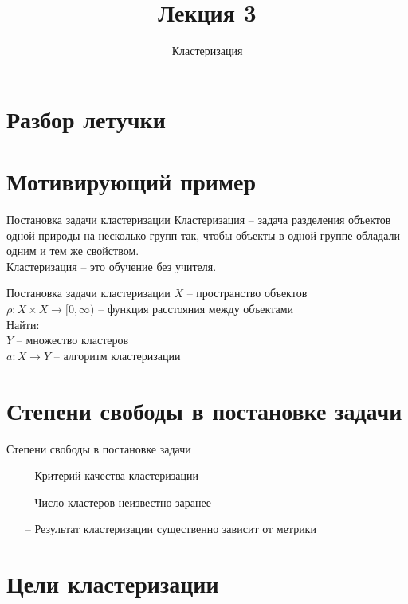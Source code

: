 \documentclass[10pt]{beamer}
\title{Лекция 3}
\subtitle{Кластеризация}
\begin{document}
\maketitle

\section{Разбор летучки}

\section{Мотивирующий пример}

\begin{frame}{Постановка задачи кластеризации}
  Кластеризация -- задача разделения объектов одной природы на несколько групп так, чтобы объекты в одной группе обладали одним и тем же свойством.\\
  \bigbreak
  Кластеризация -- это обучение без учителя.
\end{frame}

\begin{frame}{Постановка задачи кластеризации}
	$X$ -- пространство объектов\\
	$\rho: X \times X \rightarrow [0, \infty)$ -- функция расстояния между объектами\\
	\bigbreak
	\alert{Найти}:\\
	$Y$ -- множество кластеров \\
	$a: X \rightarrow Y$ -- алгоритм кластеризации
\end{frame}


\section{Степени свободы в постановке задачи}

\begin{frame}{Степени свободы в постановке задачи}
	\begin{itemize} [<+- | alert@+>]
		\item[--] Критерий качества кластеризации
		\item[--] Число кластеров неизвестно заранее
		\item[--] Результат кластеризации существенно зависит от метрики
	\end{itemize}
\end{frame}

\section{Цели кластеризации}
\end{document}
